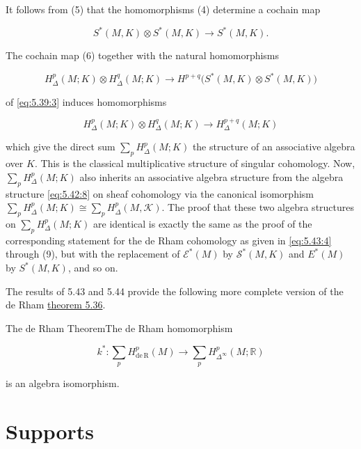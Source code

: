 It follows from (5) that the homomorphisms (4) determine a cochain map

\begin{equation}
\tag{6}\label{eq:5.44:6}
S^{*}(M,K)\otimes S^{*}(M,K)\to S^{*}(M,K).
\end{equation}

The cochain map (6) together with the natural homomorphisms

\begin{equation}
\tag{7}\label{eq:5.44:7}
H_{\Delta}^{p}(M;K)\otimes H_{\Delta}^{q}(M;K)\to H^{p+q}\big(S^{*}(M,K)\otimes S^{*}(M,K)\big)
\end{equation}

of \eqref{eq:5.39:3} induces homomorphisms

\begin{equation}
\tag{8}\label{eq:5.44:8}
H_{\Delta}^{p}(M;K)\otimes H_{\Delta}^{q}(M;K)\to H_{\Delta}^{p+q}(M;K)
\end{equation}


which give the direct sum  $\sum_{p} H_{\Delta}^{p}(M;K)$ the structure of an associative algebra over $K$. This is the classical multiplicative structure of singular cohomology. Now, $\sum_{p} H_{\Delta}^{p}(M;K)$ also inherits an associative algebra structure from the algebra structure \eqref{eq:5.42:8} on sheaf cohomology via the canonical isomorphism $\sum_{p} H_{\Delta}^{p}(M;K)\cong\sum_{p} H_{\Delta}^{p}(M,\mathcal{K})$. The proof that these two algebra structures on $\sum_{p} H_{\Delta}^{p}(M;K)$ are identical is exactly the same as the proof of the corresponding statement for the de Rham cohomology as given in \eqref{eq:5.43:4} through (9), but with the replacement of $\mathcal{E}^{*}(M)$ by $\mathcal{S}^{*}(M,K)$ and $E^{*}(M)$ by $S^{*}(M,K)$, and so on.

The results of 5.43 and 5.44 provide the following more complete version of the de Rham \hyperref[thm:5.36]{theorem 5.36}.

\begin{theorem}{The de Rham Theorem}\label{thm:5.45}The de Rham homomorphism

\begin{equation}
\tag{1}\label{eq:5.45:1}
k^{*}\colon\sum_{p}H_{\mathrm{de\,R}}^{p}(M)\to\sum_{p}H_{\Delta^{\infty}}^{p}(M;\mathbb{R})
\end{equation}

is an algebra isomorphism.
\end{theorem}

\section{Supports}


